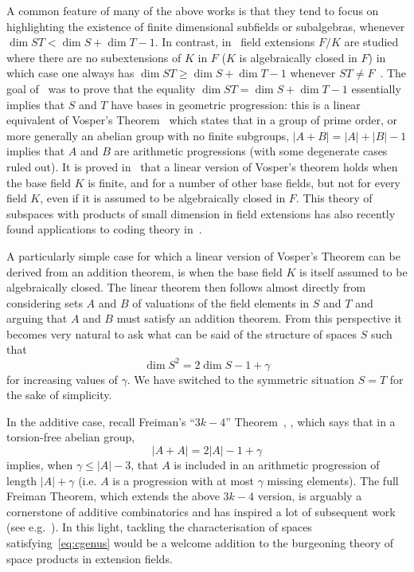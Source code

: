 \documentclass[ALCO,Unicode,ThmDefs]{cedram}
\renewcommand{\geq}{\geqslant}
\renewcommand{\leq}{\leqslant}
\begin{document}
A common feature of {many of} the above works is that they tend to focus on highlighting the existence of finite dimensional subfields or subalgebras, whenever $\dim ST < \dim S + \dim T -1$. In contrast, in~\cite{bszVosper} field extensions $F/K$ are studied where there are no subextensions of $K$ in $F$ ($K$ is algebraically closed in $F$) in which case one always has $\dim ST\geq\dim S +\dim T -1$ whenever $ST\neq F$~\cite{el09}. The goal of~\cite{bszVosper} was to prove that the equality $\dim ST=\dim S +\dim T -1$ essentially implies that $S$ and $T$ have bases in geometric progression: this is a linear equivalent of Vosper's Theorem~\cite{Vosper} which states that in a group of prime order, or more generally an abelian group with no finite subgroups, $|A+B|=|A|+|B|-1$ implies that $A$ and $B$ are arithmetic progressions (with some degenerate cases ruled out). It is proved in~\cite{bszVosper} that a linear version of Vosper's theorem holds when the base field $K$ is finite, and for a number of other base fields, but not for every field $K$, even if it is assumed to be algebraically closed in $F$. This theory of subspaces with products of small dimension in field extensions has also recently found applications to coding theory in~\cite{RRT18}.

A particularly simple case for which a linear version of Vosper's Theorem can be derived from an addition theorem, is when the base field $K$ is itself assumed to be algebraically closed. The linear theorem then follows almost directly from considering sets $A$ and $B$ of valuations of the field elements in $S$ and $T$ and arguing that $A$ and $B$ must satisfy an addition theorem. From this perspective it becomes very natural to ask what can be said of the structure of spaces $S$ such that
\begin{equation}\label{eq:cgenus}
\dim S^2=2\dim S -1 +\gamma
\end{equation}
for increasing values of $\gamma$. We have switched to the symmetric situation $S=T$ for the sake of simplicity.

In the additive case, recall Freiman's ``$3k-4$'' Theorem~\cite{Freiman}, \cite[Theorem~5.11]{TaoVu}, which says that in a torsion-free abelian group,
\[
|A+A|=2|A|-1+\gamma
\]
implies, when $\gamma\leq|A|-3$, that $A$ is included in an arithmetic progression of length $|A|+\gamma$ (i.e. $A$ is a progression with at most $\gamma$ missing elements). The full Freiman Theorem, which extends the above $3k-4$ version, is arguably a cornerstone of additive combinatorics and has inspired a lot of subsequent work (see e.g.~\cite{TaoVu}). In this light, tackling the characterisation of spaces satisfying~\eqref{eq:cgenus} would be a welcome addition to the burgeoning theory of space products in extension fields.
\end{document}
